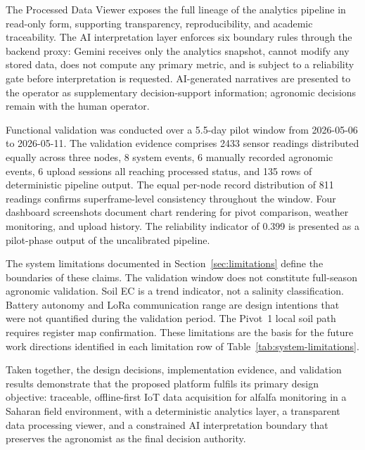 The Processed Data Viewer exposes the full lineage of the analytics pipeline in read-only form, supporting transparency, reproducibility, and academic traceability. The AI interpretation layer enforces six boundary rules through the backend proxy: Gemini receives only the analytics snapshot, cannot modify any stored data, does not compute any primary metric, and is subject to a reliability gate before interpretation is requested. AI-generated narratives are presented to the operator as supplementary decision-support information; agronomic decisions remain with the human operator.

Functional validation was conducted over a 5.5-day pilot window from 2026-05-06 to 2026-05-11. The validation evidence comprises 2433 sensor readings distributed equally across three nodes, 8 system events, 6 manually recorded agronomic events, 6 upload sessions all reaching processed status, and 135 rows of deterministic pipeline output. The equal per-node record distribution of 811 readings confirms superframe-level consistency throughout the window. Four dashboard screenshots document chart rendering for pivot comparison, weather monitoring, and upload history. The reliability indicator of 0.399 is presented as a pilot-phase output of the uncalibrated pipeline.

The system limitations documented in Section~\ref{sec:limitations} define the boundaries of these claims. The validation window does not constitute full-season agronomic validation. Soil EC is a trend indicator, not a salinity classification. Battery autonomy and LoRa communication range are design intentions that were not quantified during the validation period. The Pivot~1 local soil path requires register map confirmation. These limitations are the basis for the future work directions identified in each limitation row of Table~\ref{tab:system-limitations}.

Taken together, the design decisions, implementation evidence, and validation results demonstrate that the proposed platform fulfils its primary design objective: traceable, offline-first IoT data acquisition for alfalfa monitoring in a Saharan field environment, with a deterministic analytics layer, a transparent data processing viewer, and a constrained AI interpretation boundary that preserves the agronomist as the final decision authority.

